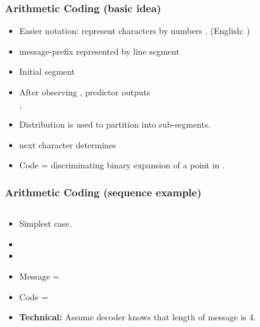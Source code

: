 \documentclass[handout]{beamer}
\begin{document}
\begin{frame}
\frametitle{Arithmetic Coding (basic idea)}
\begin{itemize}
\item Easier notation: represent characters by numbers . (English: )
\item message-prefix  represented by line segment \R{$[l_{t-1},u_{t-1})$}
\item Initial segment \R{$[l_0,u_0) = [0,1)$}
\item After observing , predictor outputs \\
,
\item Distribution is used to partition \R{$[l_{t-1},u_{t-1})$} into \R{$| \Sigma |$} sub-segments.
\item next character  determines \R{$[l_t,u_t)$}
\item Code = discriminating binary expansion of a point in \R{$[l_t,u_t)$}.
\end{itemize}
\end{frame}

\begin{frame}
\frametitle{Arithmetic Coding (sequence example)}
\begin{columns}

\begin{column}[T]{4cm}
\begin{itemize}
\item Simplest case.
\item {}
\item {}
\item Message = 
\item Code = 
\item {\bf Technical:} Assume decoder knows that length of message is 4.
\end{itemize}
\end{column}

\begin{column}[T]{5.5cm}
\end{column}

\end{columns}
\end{frame}
\end{document}
